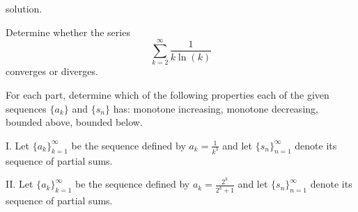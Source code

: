 \documentclass[handout]{ximera}
\begin{document}
\begin{freeResponse}
solution.
\end{freeResponse}


\begin{problem}
Determine whether the series
$$
\sum_{k=2}^\infty \frac{1}{k \ln (k)}
$$
converges or diverges.
\end{problem}

\begin{problem}
For each part, determine which of the following properties each of the given sequences $\{a_k\}$ and $\{s_n\}$ has: monotone increasing, monotone decreasing, bounded above, bounded below. 

I. Let $\{a_k\}_{k=1}^\infty$ be the sequence defined by $a_k = \frac{1}{k^3}$ and let $\{s_n\}_{n=1}^\infty$ denote its sequence of partial sums. 

II. Let $\{a_k\}_{k=1}^\infty$ be the sequence defined by $a_k = \frac{2^k}{2^k +1}$ and let $\{s_n\}_{n=1}^\infty$ denote its sequence of partial sums.
\end{problem}
\end{document}

